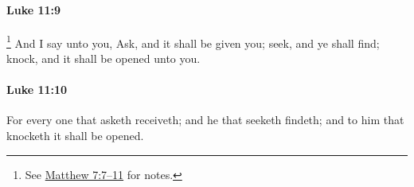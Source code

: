 		\paragraph{Luke 11:9} %
			\label{LUKE-11-9}

				\footnote{%
					See \hyperref[MATTHEW-7-7]{Matthew 7:7--11} for notes.
					}%
			And I say unto you, Ask, and it shall be given you; seek, and ye shall find; knock, and it shall be opened unto you.

			\begin{framed}
			\scriptsize
				\begin{compactdesc}
					\item[SBLG] 
				\end{compactdesc}
			\end{framed}

		\paragraph{Luke 11:10} %
			\label{LUKE-11-10}

			For every one that asketh receiveth; and he that seeketh findeth; and to him that knocketh it shall be opened.

